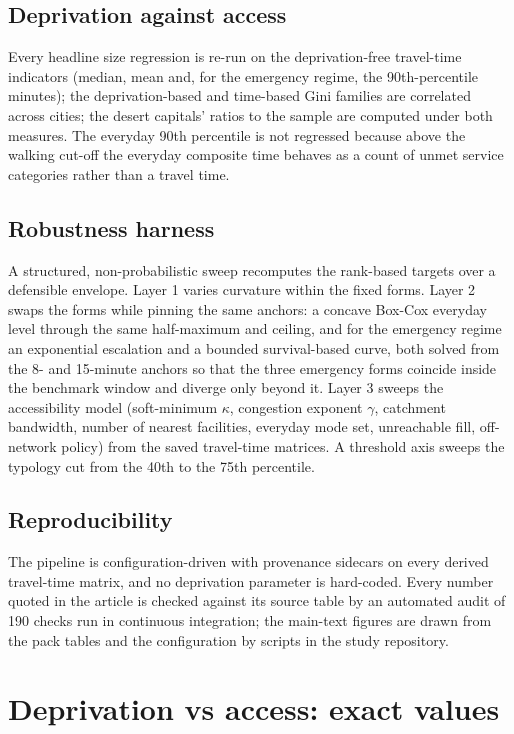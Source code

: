 \documentclass[11pt]{article}
\begin{document}
\subsection{Deprivation against access}
Every headline size regression is re-run on the deprivation-free
travel-time indicators (median, mean and, for the emergency regime, the
90th-percentile minutes); the deprivation-based and time-based Gini
families are correlated across cities; the desert capitals' ratios to the
sample are computed under both measures. The everyday 90th percentile is
not regressed because above the walking cut-off the everyday composite
time behaves as a count of unmet service categories rather than a travel
time.

\subsection{Robustness harness}
A structured, non-probabilistic sweep recomputes the rank-based targets
over a defensible envelope. Layer 1 varies curvature within the fixed
forms. Layer 2 swaps the forms while pinning the same anchors: a concave
Box-Cox everyday level through the same half-maximum and ceiling, and for
the emergency regime an exponential escalation
\citep{holguinveras2013objective} and a bounded survival-based curve, both
solved from the 8- and 15-minute anchors so that the three emergency forms
coincide inside the benchmark window and diverge only beyond it. Layer 3
sweeps the accessibility model (soft-minimum $\kappa$, congestion exponent
$\gamma$, catchment bandwidth, number of nearest facilities, everyday mode
set, unreachable fill, off-network policy) from the saved travel-time
matrices. A threshold axis sweeps the typology cut from the 40th to the
75th percentile.

\subsection{Reproducibility}
The pipeline is configuration-driven with provenance sidecars on every
derived travel-time matrix, and no deprivation parameter is hard-coded.
Every number quoted in the article is checked against its source table by
an automated audit of 190 checks run in continuous integration; the
main-text figures are drawn from the pack tables and the configuration by
scripts in the study repository.

\section{Deprivation vs access: exact values}\label{si:depvsaccess}
\end{document}
